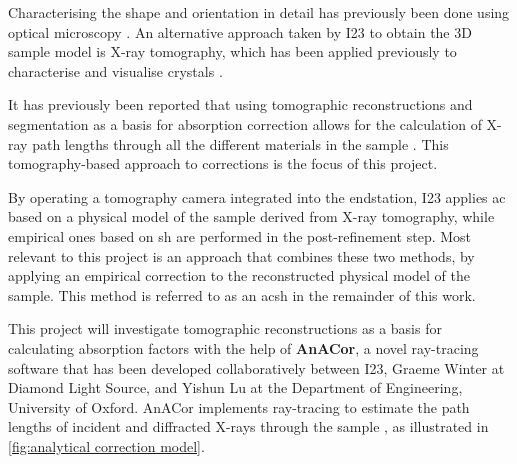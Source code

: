 Characterising the shape and orientation in detail has previously been done using optical microscopy \cite{Leal2008, Strutz2011}. %
An alternative approach taken by I23 to obtain the 3D sample model is X-ray tomography, which has been applied previously to characterise and visualise crystals \cite{Merrifield2011, Warren2013}.%

 It has previously been reported that using tomographic reconstructions and segmentation as a basis for absorption correction allows for the calculation of X-ray path lengths through all the different materials in the sample \cite{Brockhauser2008}. This tomography-based approach to corrections is the focus of this project.

By operating a tomography camera integrated into the endstation, I23 applies \ac{ac} based on a physical model of the sample derived from X-ray tomography, while empirical ones based on \ac{sh} are performed in the post-refinement step. Most relevant to this project is an approach that combines these two methods, by applying an empirical correction to the reconstructed physical model of the sample. This method is referred to as an \ac{acsh} in the remainder of this work. %

This project will investigate tomographic reconstructions as a basis for calculating absorption factors with the help of \textbf{AnACor}, a novel ray-tracing software that has been developed collaboratively between I23, Graeme Winter at Diamond Light Source, and Yishun Lu at the Department of Engineering, University of Oxford. AnACor implements ray-tracing to estimate the path lengths of incident and diffracted X-rays through the sample \cite{Lu2024}, as illustrated in \cref{fig:analytical correction model}.


